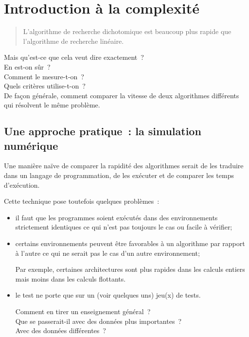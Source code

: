 		\clearpage
	\section{Introduction à la complexité} 

		\begin{quote}
		
			L’algorithme de recherche dichotomique est beaucoup plus rapide que
			l’algorithme de recherche linéaire. 
	
		\end{quote}
		
		Mais qu’est-ce que cela veut dire exactement~? \\
		En est-on sûr~? \\
		Comment le mesure-t-on~? \\
		Quels critères utilise-t-on~? \\

		De façon générale, comment comparer la vitesse de deux algorithmes
		différents qui résolvent le même problème.
		
		\subsection{Une approche pratique~: la simulation numérique}
	
			Une manière naïve de comparer la rapidité des algorithmes serait de
			les traduire dans un langage de programmation, de les exécuter et de
			comparer les temps d'exécution.

			Cette technique pose toutefois quelques problèmes~:			
			\begin{itemize}
				
				\item il faut que les programmes soient exécutés 
					dans des environnements strictement identiques 
					ce qui n’est pas toujours le cas ou facile à vérifier;
				
				\item certains environnements peuvent être favorables à un
					algorithme par rapport à l’autre ce qui ne serait pas le cas
					d’un autre environnement;
					
					Par exemple, certaines architectures
					sont plus rapides dans les calculs entiers
					mais moins dans les calculs flottants.
				
				\item le test ne porte que sur un (voir quelques uns) jeu(x) de
					tests.  
					
					Comment en tirer un enseignement général~?\\
					Que se passerait-il avec des données plus importantes~?\\
					Avec des données différentes~?
		
			\end{itemize}	

